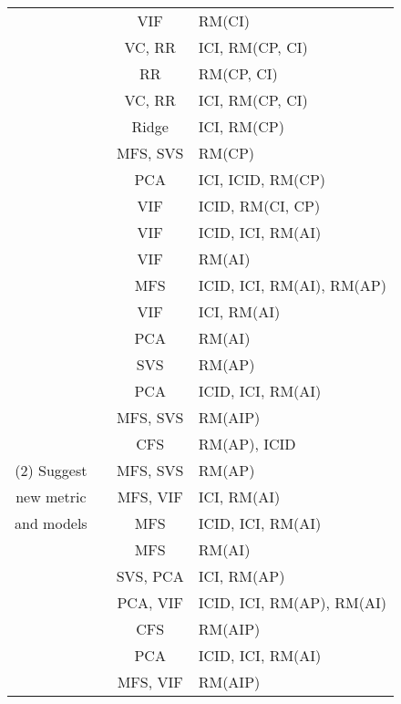 \begin{table*}
{\begin{tabular}{c|c|c|l}
& \cite{Ray2014FSElaguageandquality} & VIF & RM(CI) \\
& \cite{Tantithamthavorn2018TSEClassRebalancing} & VC, RR & ICI, RM(CP, CI) \\
& \cite{Tantithamthavorn2015ICSEMislabelling} & RR & RM(CP, CI) \\
& \cite{Tantithamthavorn2019TSEAutomatedParameter} & VC, RR & ICI, RM(CP, CI) \\
& \cite{Yang2018TRRidge} & Ridge & ICI, RM(CP) \\
& \cite{Yang2016FSEunsupervised} & MFS, SVS & RM(CP) \\
& \cite{Zhang2017TSEaggregate} & PCA & ICI, ICID, RM(CP) \\
& \cite{Zhao2015ISTPackageMetrics} & VIF & ICID, RM(CI, CP) \\
\hline
& \cite{Bettenburg2013EMSEinteractions} & VIF & ICID, ICI, RM(AI) \\
& \cite{Bird2012MSRdistributed} & VIF & RM(AI) \\
& \cite{Bird2011FSEdonttouch} & MFS & ICID, ICI, RM(AI), RM(AP) \\
& \cite{Cataldo2009TSEdependencies} & VIF & ICI, RM(AI) \\
& \cite{Chen2012MSRExplaining} & PCA & RM(AI) \\
& \cite{Devine2016ASEJSPL} & SVS & RM(AP) \\
& \cite{Eaddy2008TSEcrosscutting} & PCA & ICID, ICI, RM(AI) \\
& \cite{Kamei2013TSEjit} & MFS, SVS & RM(AIP) \\
& \cite{Lee2016TSEMIM} & CFS & RM(AP), ICID \\
(2) Suggest & \cite{Kondo2020EMSEContext} & MFS, SVS & RM(AP) \\
new metric & \cite{McIntosh2014MSRCodeReview} & MFS, VIF & ICI, RM(AI) \\
and models & \cite{Meneely2011FSEmanpower} & MFS & ICID, ICI, RM(AI) \\
& \cite{Mockus2010FSEOrgVolatlity} & MFS & RM(AI) \\
& \cite{Nagappan2008ICSEorg} & SVS, PCA & ICI, RM(AP) \\
& \cite{Pinzger2008FSEnetwork} & PCA, VIF & ICID, ICI, RM(AP), RM(AI) \\
& \cite{Shihab2012FSEindustrial} & CFS & RM(AIP) \\
& \cite{Shang2015EMSElog} & PCA & ICID, ICI, RM(AI) \\
& \cite{Shihab2011FSEhighimpact} & MFS, VIF & RM(AIP) \\

\end{tabular}}
\end{table*}
